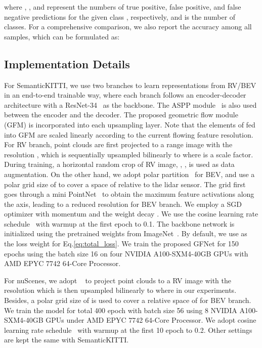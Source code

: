where , , and  represent the numbers of true positive, false positive, and false negative predictions for the given class , respectively, and  is the number of classes. For a comprehensive comparison, we also report the accuracy among all samples, which can be formulated as:


\subsection{Implementation Details}
\label{sec:imple}
For SemanticKITTI, we use two branches to learn representations from RV/BEV in an end-to-end trainable way, where each branch follows an encoder-decoder architecture with a ResNet-34~\citep{he2016deep} as the backbone. The ASPP module~\citep{chen2017rethinking} is also used between the encoder and the decoder. The proposed geometric flow module (GFM) is incorporated into each upsampling layer. Note that the elements of  fed into GFM are scaled linearly according to the current flowing feature resolution. For RV branch, point clouds are first projected to a range image with the resolution , which is sequentially upsampled bilinearly to  where  is a scale factor. During training, a horizontal  random crop of RV image, \ie, , is used as data augmentation. On the other hand, we adopt polar partition~\citep{zhang2020polarnet} for BEV, and use a polar grid size of  to cover a space of  relative to the lidar sensor. The grid first goes through a mini PointNet~\citep{qi2017pointnet} to obtain the maximum feature activations along the  axis, leading to a reduced resolution  for BEV branch. We employ a SGD optimizer with momentum  and the weight decay . We use the cosine learning rate schedule~\citep{loshchilov2016sgdr} with warmup at the first epoch to 0.1. The backbone network is initialized using the pretrained weights from ImageNet~\citep{deng2009imagenet}. By default, we use  as the loss weight for Eq.\ref{eq:total_loss}. We train the proposed GFNet for 150 epochs using the batch size 16 on four NVIDIA A100-SXM4-40GB GPUs with AMD EPYC 7742 64-Core Processor.

For nuScenes, we adopt ~\cite{milioto2019rangenet++} to project point clouds to a RV image with the resolution  which is then upsampled bilinearly to  where  in our experiments. Besides, a polar grid size of  is used to cover a relative space of  for BEV branch. We train the model for total 400 epoch with batch size 56 using 8 NVIDIA A100-SXM4-40GB GPUs under AMD EPYC 7742 64-Core Processor. We adopt cosine learning rate schedule~\citep{loshchilov2016sgdr} with warmup at the first 10 epoch to 0.2. Other settings are kept the same with SemanticKITTI.




